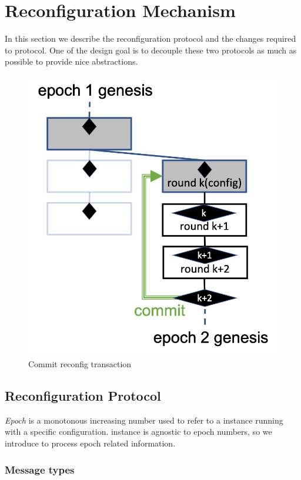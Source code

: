 \section{Reconfiguration Mechanism} \label{mechanism}

In this section we describe the reconfiguration protocol and the changes required to \LBFT protocol.
One of the design goal is to decouple these two protocols as much as possible to provide nice abstractions.
\begin{figure}[h]
			\centering
		\includegraphics[scale=.45]{figures/reconfig1.png}
	\caption{Commit reconfig transaction}
\end{figure}

\subsection{Reconfiguration Protocol}

\emph{Epoch} is a monotonous increasing number used to refer to a \LBFT instance running with a specific configuration.
\LBFT instance is agnostic to epoch numbers, so we introduce  to process epoch related information.

\subsubsection{Message types}

